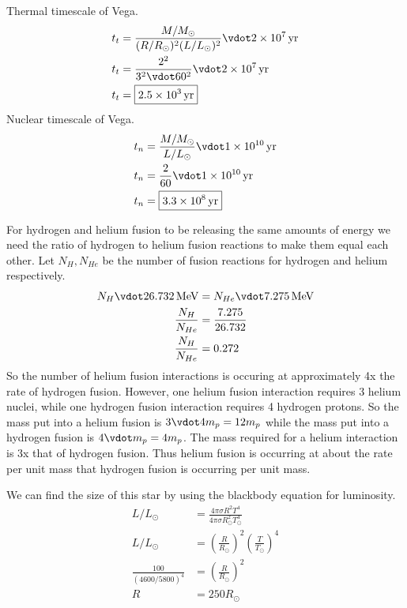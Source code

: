 \documentclass[newpage]{homework}
\begin{document}
\maketitle


\question
Thermal timescale of Vega.
\begin{align*}
    t_t	&=	\frac{M/M_\odot}{(R/R_\odot)^2(L/L_\odot)^2} \vdot \SI{2e7}{yr}	\\
    t_t	&=	\frac{2^2}{3^2 \vdot  60^2} \vdot \SI{2e7}{yr}	\\
    t_t &=  \boxed{\SI{2.5e3}{yr}}    \\
\end{align*}
Nuclear timescale of Vega.
\begin{align*}
    t_n	&=	\frac{M/M_\odot}{L/L_\odot} \vdot \SI{1e10}{yr}	\\
    t_n    &=	\frac{2}{60} \vdot \SI{1e10}{yr}	\\
    t_n    &=	\boxed{\SI{3.3e8}{yr}}	\\
\end{align*}


\question
For hydrogen and helium fusion to be releasing the same amounts of energy we need the ratio of hydrogen to helium fusion reactions to make them equal each other. Let $N_H, N_{He}$ be the number of fusion reactions for hydrogen and helium respectively.
\begin{align*}
    N_H \vdot \SI{26.732}{\MeV}	&=	N_{He} \vdot \SI{7.275}{\MeV}	\\
    \frac{N_H}{N_{He}}    &=	\frac{7.275}{26.732}	\\
    \frac{N_H}{N_{He}}    &=	0.272	\\
\end{align*}
So the number of helium fusion interactions is occuring at approximately 4x the rate of hydrogen fusion. However, one helium fusion interaction requires 3 helium nuclei, while one hydrogen fusion interaction requires 4 hydrogen protons. So the mass put into a helium fusion is $3 \vdot 4m_p = 12m_p$ while the mass put into a hydrogen fusion is $4 \vdot m_p = 4m_p$. The mass required for a helium interaction is 3x that of hydrogen fusion. Thus helium fusion is occurring at about  the rate per unit mass that hydrogen fusion is occurring per unit mass.

We can find the size of this star by using the blackbody equation for luminosity.
\begin{align*}
    L/L_\odot	&=	\frac{4\pi \sigma R^2 T^4}{4\pi \sigma R_\odot^2 T_\odot^4}	\\
    L/L_\odot   &=  \left(\frac{R}{R_\odot}\right)^2 \left(\frac{T}{T_\odot}\right)^4   \\
    \frac{100}{(4600/5800)^4} &=  \left(\frac{R}{R_\odot}\right)^2  \\
    R   &=  \boxed{250 R_\odot}
\end{align*}
\end{document}
